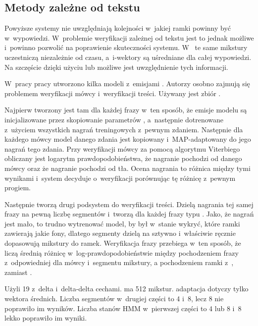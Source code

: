 
\subsection{Metody zależne od tekstu}

Powyższe systemy nie uwzględniają kolejności w~jakiej ramki powinny być w~wypowiedzi. W~problemie weryfikacji
zależnej od tekstu jest to jednak możliwe i~powinno pozwolić na poprawienie skuteczności systemu.
W~ te same mikstury uczestniczą niezależnie od czasu, a~i-wektory są uśredniane dla całej
wypowiedzi. Na szczęście dzięki użyciu  lub  możliwe jest uwzględnienie tych
informacji\cite{parallelSpeakerAnd}.

W~pracy \cite{parallelSpeakerAnd}
pracy utworzono kilka modeli  z~emisjami . Autorzy osobno
zajmują się problemem weryfikacji mówcy i~weryfikacji treści. Używany jest zbiór .

Najpierw tworzony jest tam  dla każdej frazy w~ten sposób, że emisje modelu są inicjalizowane przez
skopiowanie parametrów ,
a~następnie dotrenowane z~użyciem wszystkich nagrań treningowych z~pewnym zdaniem.
Następnie dla każdego mówcy model danego zdania jest kopiowany i~MAP-adaptowany do jego nagrań tego zdania.
Przy weryfikacji mówcy za pomocą algorytmu Viterbiego obliczany jest logarytm
prawdopodobieństwa, że nagranie pochodzi od danego mówcy oraz że nagranie pochodzi od  tła.
Ocena nagrania to różnica między tymi wynikami i~system decyduje o~weryfikacji porównując tę różnicę z~pewnym progiem.

Następnie tworzą drugi podsystem do weryfikacji treści. Dzielą nagrania tej samej frazy na pewną liczbę segmentów
i~tworzą dla każdej frazy  typu . Jako, że nagrań jest mało, to trudno
wytrenować model, by był w~stanie wykryć, które ramki zawierają jakie fony, dlatego segmenty dzielą na sztywno
i~właściwie ręcznie dopasowują mikstury do ramek. Weryfikacja frazy przebiega w~ten sposób, że liczą średnią
różnicę w~log-prawdopodobieństwie między pochodzeniem frazy z~odpowiedniej dla mówcy i~segmentu mikstury, a
pochodzeniem ramki z~, zamiast .

Użyli 19  z~delta i~delta-delta cechami.  ma 512 mikstur.  adaptacja
dotyczy tylko wektora średnich. Liczba segmentów w~drugiej części to 4 i~8, lecz 8 nie poprawiło im wyników. Liczba
stanów HMM w~pierwszej części to 4 lub 8 i~8 lekko poprawiło im wyniki.

